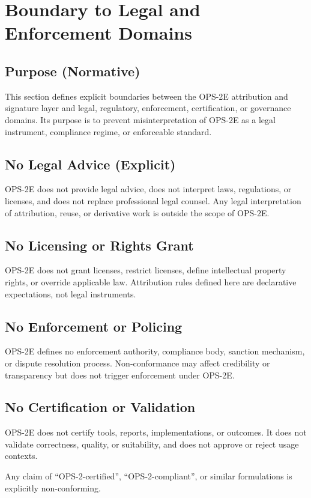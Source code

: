 \section{Boundary to Legal and Enforcement Domains}

\subsection{Purpose (Normative)}
This section defines explicit boundaries between the OPS-2E attribution and signature layer and legal, regulatory, enforcement, certification, or governance domains.
Its purpose is to prevent misinterpretation of OPS-2E as a legal instrument, compliance regime, or enforceable standard.

\subsection{No Legal Advice (Explicit)}
OPS-2E does not provide legal advice, does not interpret laws, regulations, or licenses, and does not replace professional legal counsel.
Any legal interpretation of attribution, reuse, or derivative work is outside the scope of OPS-2E.

\subsection{No Licensing or Rights Grant}
OPS-2E does not grant licenses, restrict licenses, define intellectual property rights, or override applicable law.
Attribution rules defined here are declarative expectations, not legal instruments.

\subsection{No Enforcement or Policing}
OPS-2E defines no enforcement authority, compliance body, sanction mechanism, or dispute resolution process.
Non-conformance may affect credibility or transparency but does not trigger enforcement under OPS-2E.

\subsection{No Certification or Validation}
OPS-2E does not certify tools, reports, implementations, or outcomes.
It does not validate correctness, quality, or suitability, and does not approve or reject usage contexts.

Any claim of ``OPS-2-certified'', ``OPS-2-compliant'', or similar formulations is explicitly non-conforming.

